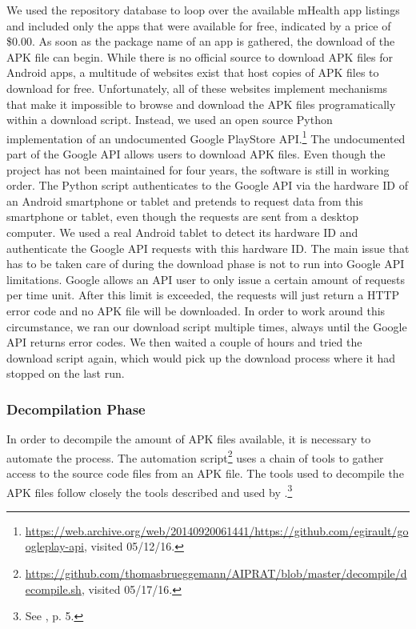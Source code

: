 We used the repository database to loop over the available mHealth app listings and included only the apps that were available for free, indicated by a price of \$0.00.
As soon as the package name of an app is gathered, the download of the \acs{APK} file can begin. 
While there is no official source to download \acs{APK} files for Android apps, a multitude of websites exist that host copies of \acs{APK} files to download for free.
Unfortunately, all of these websites implement mechanisms that make it impossible to browse and download the APK files programatically within a download script.
Instead, we used an open source Python implementation of an undocumented Google PlayStore \acs{API}.\footnote{\raggedright\url{https://web.archive.org/web/20140920061441/https://github.com/egirault/googleplay-api}, visited 05/12/16.} 
The undocumented part of the Google API allows users to download APK files.
Even though the project has not been maintained for four years, the software is still in working order.
The Python script authenticates to the Google API via the hardware ID of an Android smartphone or tablet and pretends to request data from this smartphone or tablet, even though the requests are sent from a desktop computer.
We used a real Android tablet to detect its hardware ID and authenticate the Google API requests with this hardware ID.
The main issue that has to be taken care of during the download phase is not to run into Google API limitations. 
Google allows an API user to only issue a certain amount of requests per time unit. 
After this limit is exceeded, the requests will just return a HTTP error code and no APK file will be downloaded.
In order to work around this circumstance, we ran our download script multiple times, always until the Google API returns error codes. 
We then waited a couple of hours and tried the download script again, which would pick up the download process where it had stopped on the last run.

\subsubsection{Decompilation Phase}

In order to decompile the amount of APK files available, it is necessary to automate the process. 
The automation script\footnote{\raggedright \url{https://github.com/thomasbrueggemann/AIPRAT/blob/master/decompile/decompile.sh}, visited 05/17/16.} uses a chain of tools to gather access to the source code files from an APK file.
The tools used to decompile the APK files follow closely the tools described and used by \cite{Enck2011}.\footnote{See \cite{Enck2011}, p. 5.}

